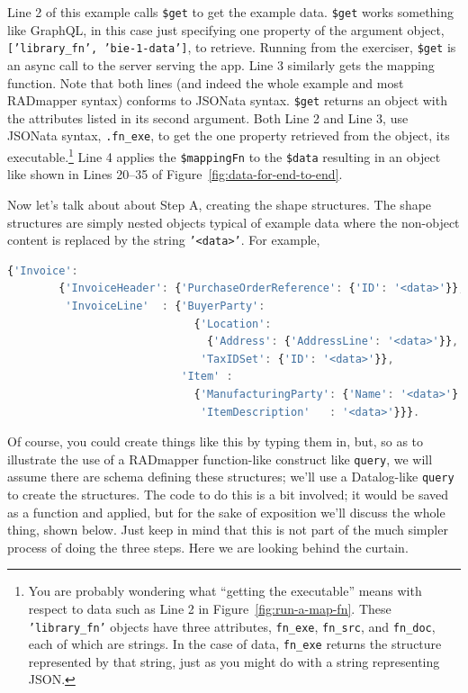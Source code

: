 \documentclass[10pt,letterpaper]{article} %
\newcommand{\stt}[1]{\texttt{#1}} %
\begin{document}
Line 2 of this example calls \stt{\$get} to get the example data.
\stt{\$get} works something like GraphQL, in this case just specifying one property of the argument object, \stt{['library\_fn', 'bie-1-data']}, to retrieve.
Running from the exerciser, \stt{\$get} is an async call to the server serving the app.
Line 3 similarly gets the mapping function. Note that both lines (and indeed the whole example and most RADmapper syntax) conforms to JSONata syntax.
\stt{\$get} returns an object with the attributes listed in its second argument.
Both Line 2 and Line 3, use JSONata syntax, \stt{.fn\_exe}, to get the one property retrieved from the object, its executable.\footnote{You are probably wondering what ``getting the executable'' means with respect to  data such as Line 2 in Figure~\ref{fig:run-a-map-fn}.
  These \stt{'library\_fn'} objects have three attributes, \stt{fn\_exe}, \stt{fn\_src}, and \stt{fn\_doc},
  each of which are strings.
  In the case of data, \stt{fn\_exe} returns the structure represented by that string, just as you might do with a string representing JSON.}
Line 4 applies the \stt{\$mappingFn} to the \stt{\$data} resulting in an object like shown in Lines 20--35 of Figure~\ref{fig:data-for-end-to-end}.

Now let's talk about about Step A, creating the shape structures.
The shape structures are simply nested objects typical of example data where the non-object content is replaced by the string \stt{'<data>'}.
For example,

\begin{lstlisting}[language=JavaScript,numbers=none,basicstyle=\ttfamily\scriptsize]
      {'Invoice':
        {'InvoiceHeader': {'PurchaseOrderReference': {'ID': '<data>'}},
         'InvoiceLine'  : {'BuyerParty':
                             {'Location':
                               {'Address': {'AddressLine': '<data>'}},
                              'TaxIDSet': {'ID': '<data>'}},
                           'Item' :
                             {'ManufacturingParty': {'Name': '<data>'}
                              'ItemDescription'   : '<data>'}}}.
\end{lstlisting} \vspace{-2em}
Of course, you could create things like this by typing them in, but, so as to illustrate the use of a RADmapper function-like construct like \stt{query}, we will assume there are schema defining these structures; we'll use a Datalog-like \stt{query} to create the structures. The code to do this is a bit involved; it would be saved as a function and applied, but for the sake of exposition we'll discuss the whole thing, shown below.
Just keep in mind that this is not part of the much simpler process of doing the three steps.
Here we are looking behind the curtain.
\end{document}
